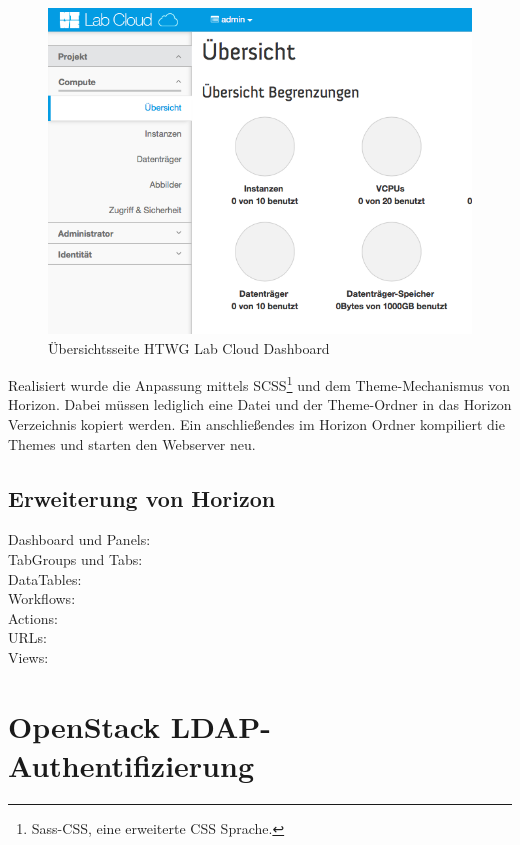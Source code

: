 \begin{figure}[htbp]
\centering
\includegraphics[scale=0.6]{img/dashboard-overview.png}
\caption{Übersichtsseite HTWG Lab Cloud Dashboard}
\label{dashboard-overview}
\end{figure}

Realisiert wurde die Anpassung mittels SCSS\footnote{Sass-CSS, eine erweiterte CSS Sprache.} und dem Theme-Mechanismus von Horizon.
Dabei müssen lediglich eine Datei und der  Theme-Ordner in das Horizon Verzeichnis kopiert werden.
Ein anschließendes  im Horizon Ordner kompiliert die Themes und starten den Webserver neu.

\subsection{Erweiterung von Horizon}

\begin{description}
\item[Dashboard und Panels: ]
\item[TabGroups und Tabs: ]
\item[DataTables: ] 
\item[Workflows: ] 
\item[Actions: ] 
\item[URLs: ] 
\item[Views: ] 
\end{description}

\section{OpenStack LDAP-Authentifizierung}

